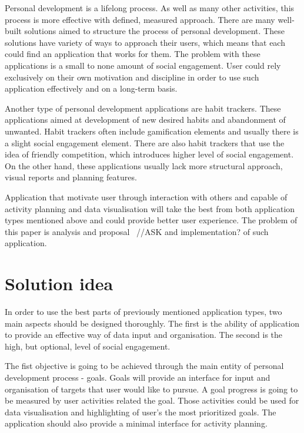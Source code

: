 Personal development is a lifelong process.
As well as many other activities, this process is more effective with defined, measured approach.
There are many well-built solutions aimed to structure the process of personal development.
These solutions have variety of ways to approach their users, which means that each could find an application that works for them.
The problem with these applications is a small to none amount of social engagement.
User could rely exclusively on their own motivation and discipline in order to use such application effectively and on a long-term basis.

Another type of personal development applications are habit trackers.
These applications aimed at development of new desired habits and abandonment of unwanted.
Habit trackers often include gamification elements and usually there is a slight social engagement element.
There are also habit trackers that use the idea of friendly competition, which introduces higher level of social engagement.
On the other hand, these applications usually lack more structural approach, visual reports and planning features.

Application that motivate user through interaction with others and capable of activity planning and data visualisation
will take the best from both application types mentioned above and could provide better user experience.
The problem of this paper is analysis and proposal ~{\color{gray}//ASK and implementation?} of such application.


\section{Solution idea}\label{sec:solution-idea}

In order to use the best parts of previously mentioned application types, two main aspects should be designed thoroughly.
The first is the ability of application to provide an effective way of data input and organisation.
The second is the high, but optional, level of social engagement.

The fist objective is going to be achieved through the main entity of personal development process - goals.
Goals will provide an interface for input and organisation of targets that user would like to pursue.
A goal progress is going to be measured by user activities related the goal.
Those activities could be used for data visualisation and highlighting of user's the most prioritized goals.
The application should also provide a minimal interface for activity planning.

